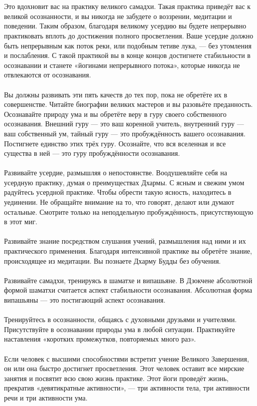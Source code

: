 \\ \\ Это вдохновит вас на практику великого самадхи. Такая практика приведёт вас к великой осознанности, и вы никогда не забудете о воззрении, медитации и поведении. Таким образом, благодаря великому усердию вы будете непрерывно практиковать вплоть до достижения полного просветления. Ваше усердие должно быть непрерывным как поток реки, или подобным тетиве лука, — без утомления и послабления. С такой практикой вы в конце концов достигнете стабильности в осознавании и станете «йогинами непрерывного потока», которые никогда не отвлекаются от осознавания.
\\ \\ Вы должны развивать эти пять качеств до тех пор, пока не обретёте их в совершенстве. Читайте биографии великих мастеров и вы разовьёте преданность. Осознавайте природу ума и вы обретёте веру в гуру своего собственного осознавания. Внешний гуру — это ваш коренной учитель, внутренний гуру — ваш собственный ум, тайный гуру — это пробуждённость вашего осознавания. Постигнете единство этих трёх гуру. Осознайте, что вся вселенная и все существа в ней — это гуру пробуждённости осознавания.
\\ \\ Развивайте усердие, размышляя о непостоянстве. Воодушевляйте себя на усердную практику, думая о преимуществах Дхармы. С ясным и свежим умом радуйтесь усердной практике. Чтобы обрести такую ясность, находитесь в уединении. Не обращайте внимание на то, что говорят, делают или думают остальные. Смотрите только на неподдельную пробуждённость, присутствующую в этот миг.
\\ \\ Развивайте знание посредством слушания учений, размышления над ними и их практического применения. Благодаря интенсивной практике вы обретёте знание, происходящее из медитации. Вы познаете Дхарму Будды без обучения.
\\ \\ Развивайте самадхи, тренируясь в шаматхе и випашьяне. В Дзокчене абсолютной формой шаматхи считается аспект стабильности осознавания. Абсолютная форма випашьяны — это постигающий аспект осознавания.
\\ \\ Тренируйтесь в осознанности, общаясь с духовными друзьями и учителями. Присутствуйте в осознавании природы ума в любой ситуации. Практикуйте наставления «коротких промежутков, повторяемых много раз».
\\ \\ Если человек с высшими способностями встретит учение Великого Завершения, он или она быстро достигнет просветления. Этот человек оставит все мирские занятия и посвятит всю свою жизнь практике. Этот йоги проведёт жизнь, прекратив «девятикратные активности», — три активности тела, три активности речи и три активности ума.
